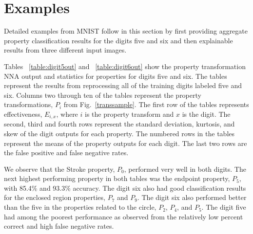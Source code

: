 \documentclass[conference]{IEEEtran}
\begin{document}
\section{Examples}

Detailed examples from MNIST follow in this section by first providing aggregate property classification results for the digits five and six and then explainable results from three different input images.

Tables ~\ref{table:digit5out} and ~\ref{table:digit6out} show the property transformation NNA output and statistics for properties for digits five and six.  The tables represent the results from reprocessing all of the training digits labeled five and six.  Columns two through ten of the tables represent the property transformations, $P_i$ from Fig.~\ref{transsample}.  The first row of the tables represents effectiveness, $E_{i,x}$, where $i$ is the property transform and $x$ is the digit.  The second, third and fourth rows represent the standard deviation, kurtosis, and skew of the digit outputs for each property.  The numbered rows in the tables represent the means of the property outputs for each digit.  The last two rows are the false positive and false negative rates.

We observe that the Stroke property, $P_0$, performed very well in both digits.  The next highest performing property in both tables was the endpoint property, $P_5$, with 85.4\% and 93.3\% accuracy.  The digit six also had good classification results for the enclosed region properties, $P_7$ and $P_9$.  The digit six also performed better than the five in the properties related to the circle, $P_2$, $P_4$, and $P_5$.  The digit five had among the poorest performance as observed from the relatively low percent correct and high false negative rates.
\end{document}
